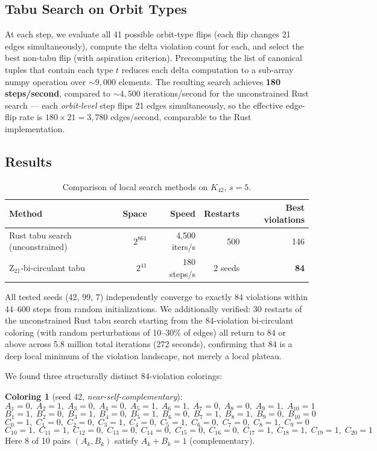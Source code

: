 \documentclass[11pt]{article}
\begin{document}
\subsection{Tabu Search on Orbit Types}

At each step, we evaluate all 41 possible orbit-type flips (each flip changes
21 edges simultaneously), compute the delta violation count for each, and
select the best non-tabu flip (with aspiration criterion).
Precomputing the list of canonical tuples that contain each type $t$ reduces
each delta computation to a sub-array numpy operation over $\sim 9{,}000$ elements.
The resulting search achieves \textbf{180 steps/second}, compared to
$\sim 4{,}500$ iterations/second for the unconstrained Rust search ---
each \emph{orbit-level} step flips 21 edges simultaneously,
so the effective edge-flip rate is $180 \times 21 = 3{,}780$ edges/second,
comparable to the Rust implementation.

\subsection{Results}

\begin{table}[h]
\centering
\begin{tabular}{lrrrr}
\toprule
Method & Space & Speed & Restarts & Best violations \\
\midrule
Rust tabu search (unconstrained) & $2^{861}$ & 4,500 iters/s & 500 & 146 \\
Z$_{21}$-bi-circulant tabu & $2^{41}$ & 180 steps/s & 2 seeds & \textbf{84} \\
\bottomrule
\end{tabular}
\caption{Comparison of local search methods on $K_{42}$, $s=5$.}
\label{tab:methods}
\end{table}

All tested seeds (42, 99, 7) independently converge to exactly 84 violations
within 44--600 steps from random initializations.
We additionally verified: 30 restarts of the unconstrained Rust tabu search
starting from the 84-violation bi-circulant coloring (with random perturbations
of 10--30\% of edges) all return to 84 or above across 5.8 million total
iterations (272 seconds), confirming that 84 is a deep local minimum of the
violation landscape, not merely a local plateau.

We found three structurally distinct 84-violation colorings:

\textbf{Coloring 1} (seed 42, \emph{near-self-complementary}):
\[
A_1\!=\!0,\; A_2\!=\!1,\; A_3\!=\!0,\; A_4\!=\!0,\; A_5\!=\!1,\;
A_6\!=\!1,\; A_7\!=\!0,\; A_8\!=\!0,\; A_9\!=\!1,\; A_{10}\!=\!1
\]
\[
B_1\!=\!1,\; B_2\!=\!0,\; B_3\!=\!1,\; B_4\!=\!0,\; B_5\!=\!1,\;
B_6\!=\!0,\; B_7\!=\!1,\; B_8\!=\!1,\; B_9\!=\!0,\; B_{10}\!=\!0
\]
\[
C_0\!=\!1,\; C_1\!=\!0,\; C_2\!=\!0,\; C_3\!=\!1,\; C_4\!=\!0,\;
C_5\!=\!1,\; C_6\!=\!0,\; C_7\!=\!0,\; C_8\!=\!1,\; C_9\!=\!0
\]
\[
C_{10}\!=\!1,\; C_{11}\!=\!1,\; C_{12}\!=\!0,\; C_{13}\!=\!0,\; C_{14}\!=\!0,\;
C_{15}\!=\!0,\; C_{16}\!=\!0,\; C_{17}\!=\!1,\; C_{18}\!=\!1,\; C_{19}\!=\!1,\; C_{20}\!=\!1
\]
Here 8 of 10 pairs $(A_k, B_k)$ satisfy $A_k + B_k = 1$ (complementary).
\end{document}
